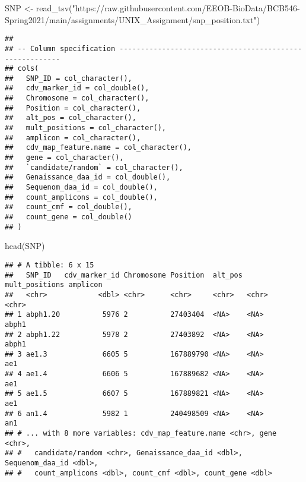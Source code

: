 \documentclass[
]{article}
\newenvironment{Shaded}{\begin{snugshade}}{\end{snugshade}}
\newcommand{\FunctionTok}[1]{\textcolor[rgb]{0.00,0.00,0.00}{#1}}
\newcommand{\NormalTok}[1]{#1}
\newcommand{\OtherTok}[1]{\textcolor[rgb]{0.56,0.35,0.01}{#1}}
\newcommand{\StringTok}[1]{\textcolor[rgb]{0.31,0.60,0.02}{#1}}
\begin{document}
\begin{Shaded}
\begin{Highlighting}[]
\NormalTok{SNP }\OtherTok{\textless{}{-}} \FunctionTok{read\_tsv}\NormalTok{(}\StringTok{"https://raw.githubusercontent.com/EEOB{-}BioData/BCB546{-}Spring2021/main/assignments/UNIX\_Assignment/snp\_position.txt"}\NormalTok{)}
\end{Highlighting}
\end{Shaded}

\begin{verbatim}
## 
## -- Column specification --------------------------------------------------------
## cols(
##   SNP_ID = col_character(),
##   cdv_marker_id = col_double(),
##   Chromosome = col_character(),
##   Position = col_character(),
##   alt_pos = col_character(),
##   mult_positions = col_character(),
##   amplicon = col_character(),
##   cdv_map_feature.name = col_character(),
##   gene = col_character(),
##   `candidate/random` = col_character(),
##   Genaissance_daa_id = col_double(),
##   Sequenom_daa_id = col_double(),
##   count_amplicons = col_double(),
##   count_cmf = col_double(),
##   count_gene = col_double()
## )
\end{verbatim}

\begin{Shaded}
\begin{Highlighting}[]
\FunctionTok{head}\NormalTok{(SNP)}
\end{Highlighting}
\end{Shaded}

\begin{verbatim}
## # A tibble: 6 x 15
##   SNP_ID   cdv_marker_id Chromosome Position  alt_pos mult_positions amplicon
##   <chr>            <dbl> <chr>      <chr>     <chr>   <chr>          <chr>   
## 1 abph1.20          5976 2          27403404  <NA>    <NA>           abph1   
## 2 abph1.22          5978 2          27403892  <NA>    <NA>           abph1   
## 3 ae1.3             6605 5          167889790 <NA>    <NA>           ae1     
## 4 ae1.4             6606 5          167889682 <NA>    <NA>           ae1     
## 5 ae1.5             6607 5          167889821 <NA>    <NA>           ae1     
## 6 an1.4             5982 1          240498509 <NA>    <NA>           an1     
## # ... with 8 more variables: cdv_map_feature.name <chr>, gene <chr>,
## #   candidate/random <chr>, Genaissance_daa_id <dbl>, Sequenom_daa_id <dbl>,
## #   count_amplicons <dbl>, count_cmf <dbl>, count_gene <dbl>
\end{verbatim}
\end{document}
